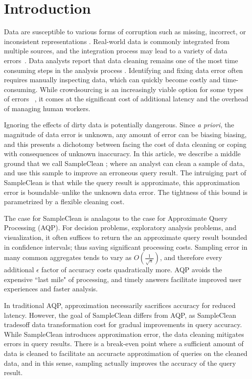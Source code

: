 \section{Introduction}
Data are susceptible to various forms of corruption such as missing,
incorrect, or inconsistent representations \cite{Gartner}.
Real-world data is commonly integrated from multiple sources, and the integration process may lead to a variety of data errors~\cite{DBLP:journals/pvldb/DongS13}. 
Data analysts report that data cleaning remains one of the most time
consuming steps in the analysis process \cite{nytimes}.
Identifying and fixing data error often requires manually inspecting data, which can quickly become costly and time-consuming. 
While crowdsourcing is an increasingly viable option for some types of errors ~\cite{DBLP:conf/sigmod/JefferyFH08,DBLP:journals/pvldb/FanLMTY10,DBLP:journals/pvldb/YakoutENOI11, gokhale2014corleone, park2014crowdfill, sampleclean,chu2015katara}, it comes at the significant cost of additional latency and the overhead of managing human workers. 

Ignoring the effects of dirty data is potentially dangerous.
Since \emph{a priori}, the magnitude of data error is unknown, any amount of error can be biasing biasing, and this presents a dichotomy between facing the cost of data cleaning
or coping with consequences of unknown inaccuracy.
In this article, we describe a middle ground that we call SampleClean \cite{wang1999sample}; where an analyst can clean a sample of data, and use this sample to improve an erroneous query result.
The intruiging part of SampleClean is that while the query result is approximate, this approximation error is boundable--unlike the unknown data error.
The tightness of this bound is parametrized by a flexible cleaning cost.

The case for SampleClean is analagous to the case for Approximate Query Processing \cite{DBLP:conf/icde/OlkenR92, olken1993random, garofalakis2001approximate, AgarwalMPMMS13} (AQP).
For decision problems, exploratory analysis problems, and visualization, it often suffices to return the an approximate query result bounded in confidence intervals; thus saving significant processing costs.
Sampling error in many common aggregates tends to vary as $O(\frac{1}{\sqrt{n}})$, and therefore every additional $\epsilon$ factor of accuracy costs quadratically more.
AQP avoids the expensive ``last mile" of processing, and timely answers facilitate improved user experiences and faster analysis.

In traditional AQP, approximation necessarily sacrifices accuracy for reduced latency. 
However, the goal of SampleClean differs from AQP, as SampleClean tradesoff data transformation cost for gradual improvements in query accuracy.
While SampleClean introduces approximation error, the data cleaning mitigates errors in query results.
There is a break-even point where a sufficient amount of data is cleaned to facilitate an accuracte approximation of queries on the cleaned data, and in this sense, sampling actually improves the accuracy of the query result.

